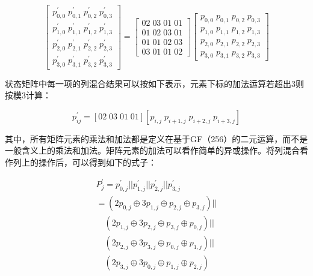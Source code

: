 \begin{equation}
	\left[ \begin{array}{l}
		p_{0,0}^{'}\;p_{0,1}^{'}\;p_{0,2}^{'}\;p_{0,3}^{'}\\
		p_{1,0}^{'}\;p_{1,1}^{'}\;p_{1,2}^{'}\;p_{1,3}^{'}\\
		p_{2,0}^{'}\;p_{2,1}^{'}\;p_{2,2}^{'}\;p_{2,3}^{'}\\
		p_{3,0}^{'}\;p_{3,1}^{'}\;p_{3,2}^{'}\;p_{3,3}^{'}
	\end{array} \right] = \left[ \begin{array}{l}
		02\;03\;01\;01\\
		01\;02\;03\;01\\
		01\;01\;02\;03\\
		03\;01\;01\;02
	\end{array} \right]\left[ \begin{array}{l}
		p_{0,0}^{}\;p_{0,1}^{}\;p_{0,2}^{}\;p_{0,3}^{}\\
		p_{1,0}^{}\;p_{1,1}^{}\;p_{1,2}^{}\;p_{1,3}^{}\\
		p_{2,0}^{}\;p_{2,1}^{}\;p_{2,2}^{}\;p_{2,3}^{}\\
		p_{3,0}^{}\;p_{3,1}^{}\;p_{3,2}^{}\;p_{3,3}^{}
	\end{array} \right]
\end{equation}

状态矩阵中每一项的列混合结果可以按如下表示，元素下标的加法运算若超出3则按模3计算：

\begin{equation}
p_{ij}^{'} = \left[ {02\;03\;01\;01} \right]\left[ {{p_{i,j}}\;{p_{i + 1,j}}\;{p_{i + 2,j}}\;{p_{i + 3,j}}} \right]
\end{equation}

其中，所有矩阵元素的乘法和加法都是定义在基于GF（256）的二元运算，而不是一般含义上的乘法和加法。矩阵元素的加法可以看作简单的异或操作。将列混合看作列上的操作后，可以得到如下的式子：

\begin{equation}
\begin{array}{l}
	P_j^{'} = p_{0,j}^{'}||p_{1,j}^{'}||p_{2,j}^{'}||p_{3,j}^{'}\\
	= (2{p_{0,j}} \oplus 3{p_{1,j}} \oplus {p_{2,j}} \oplus {p_{3,j}})||\\
	\quad (2{p_{1,j}} \oplus 3{p_{2,j}} \oplus {p_{3,j}} \oplus {p_{0,j}})||\\
	\quad (2{p_{2,j}} \oplus 3{p_{3,j}} \oplus {p_{0,j}} \oplus {p_{1,j}})||\\
	\quad (2{p_{3,j}} \oplus 3{p_{0,j}} \oplus {p_{1,j}} \oplus {p_{2,j}})
\end{array}
\end{equation}

